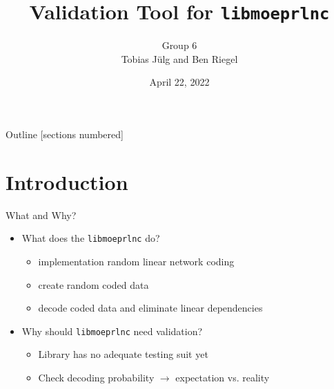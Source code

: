 \documentclass[t]{beamer} %
\title{Validation Tool for \texttt{libmoeprlnc}}
\date{April 22, 2022}
\author{Group 6\\Tobias Jülg and Ben Riegel}
\institute[TUM]{Technical University of Munich}
\begin{document}
\maketitle


\begin{frame}{Outline}
	[sections numbered]
	\tableofcontents %
\end{frame}

\section{Introduction}
\begin{frame}{What and Why?}
	\begin{itemize}
		\item What does the \texttt{libmoeprlnc} do? 
		\begin{itemize}
			\item implementation random linear network coding
			\item create random coded data
			\item decode coded data and eliminate linear dependencies
		\end{itemize}
	\end{itemize}

	\begin{itemize}
		\item Why should \texttt{libmoeprlnc} need validation? 
		\begin{itemize}
			\item Library has no adequate testing suit yet
			\item Check decoding probability $\rightarrow$ expectation vs. reality
		\end{itemize}
	\end{itemize}
\end{frame}

\end{document}
